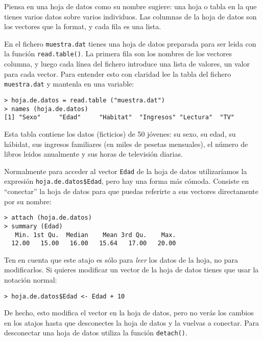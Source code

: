 Piensa en una hoja  de datos como su nombre sugiere:  una hoja o tabla
en la que tienes varios datos sobre varios individuos. Las columnas de
la hoja de  datos son los vectores  que la format, y cada  fila es una
lista.

En el  fichero {\tt  muestra.dat} tienes una  hoja de  datos preparada
para ser leida con la función  {\tt read.table()}. La primera fila son
los nombres  de los vectores columna,  y luego cada línea  del fichero
introduce  una lista  de  valores,  un valor  para  cada vector.  Para
entender esto con claridad lee  la tabla del fichero {\tt muestra.dat}
y mantenla en una variable:


\begin{verbatim}
> hoja.de.datos = read.table ("muestra.dat") 
> names (hoja.de.datos)
[1] "Sexo"     "Edad"     "Habitat"  "Ingresos" "Lectura"  "TV"
\end{verbatim}

Esta tabla contiene  los datos (ficticios) de 50 jóvenes:  su sexo, su
edad,  su  hábidat,  sus  ingresos familiares  (en  miles  de  pesetas
mensuales),  el número  de libros  leidos  anualmente y  sus horas  de
televisión diarias.

Normalmente para  acceder al  vector {\tt  Edad} de  la hoja  de datos
utilizaríamos la expresión {\tt  hoja.de.datos\$Edad}, pero hay una forma
más cómoda. Consiste en ``conectar'' la hoja de datos para que puedas
referirte a sus vectores directamente por su nombre:


\begin{verbatim}
> attach (hoja.de.datos)
> summary (Edad)
   Min. 1st Qu.  Median    Mean 3rd Qu.    Max. 
  12.00   15.00   16.00   15.64   17.00   20.00
\end{verbatim}

Ten en cuenta que  este atajo es sólo para {\em leer}  los datos de la
hoja, no para modificarlos. Si quieres  modificar un vector de la hoja
de datos tienes que usar la notación normal:

\begin{verbatim}
> hoja.de.datos$Edad <- Edad + 10
\end{verbatim}

De hecho, esto modifica  el vector en la hoja de  datos, pero no verás
los cambios en los atajos hasta que  desconectes la hoja de datos y la
vuelvas  a conectar.  Para desconectar  una hoja  de datos  utiliza la
función {\tt detach()}.

